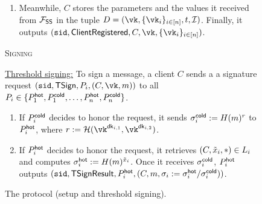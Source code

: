 \begin{figure*}
\begin{mdframed}
\begin{enumerate}
            \item Meanwhile, $C$ stores the parameters and the values it received from $\mathcal{F}_\mathsf{SS}$ in the tuple $\clientlist = (\vk, \{\vk_i\}_{i \in [n]}, t, \mathcal{I})$. Finally, it outputs $(\sid, \mathsf{ClientRegistered}, C, \vk, \{\vk_i\}_{i \in [n]})$.
        \end{enumerate}
        \begin{center}
            \textsc{Signing}
        \end{center}
        \underline{Threshold signing:} To sign a message, a client $C$ sends a a signature request $(\sid, \mathsf{TSign}, P_i, (C, \vk, m))$ to all $P_i \in \{P_1^{\mathsf{hot}},P_1^{\mathsf{cold}},\dots,P_n^{\mathsf{hot}},P_n^{\mathsf{cold}}\}$.
        \begin{enumerate}
            \item If $P_i^{\mathsf{cold}}$ decides to honor the request, it 
            sends $\sigma_i^{\mathsf{cold}} := H(m)^r$ 
            to $P_i^{\mathsf{hot}}$,
            where $r := \lhlhash(\vk^{\dk_{i,1}}, \vk^{\dk_{i,2}})$.
            \item If $P_i^{\mathsf{hot}}$ decides to honor the request, 
            it retrieves $(C, \tilde{x}_i, *) \in L_i$ and computes $\sigma_i^{\mathsf{hot}} := H(m)^{\tilde{x}_i}$.
            Once it receives 
            $\sigma_i^{\mathsf{cold}}$, $P_i^{\mathsf{hot}}$ outputs $(\texttt{sid}, \mathsf{TSignResult}, P_i^{\mathsf{hot}}, (C, m, \sigma_i := \sigma_i^{\mathsf{hot}}/\sigma_i^{\mathsf{cold}}))$.
        \end{enumerate}
        \end{mdframed}
        \caption{The \sysname protocol (setup and threshold signing).}
        \label{fig:hc_bls1}
    \end{figure*}